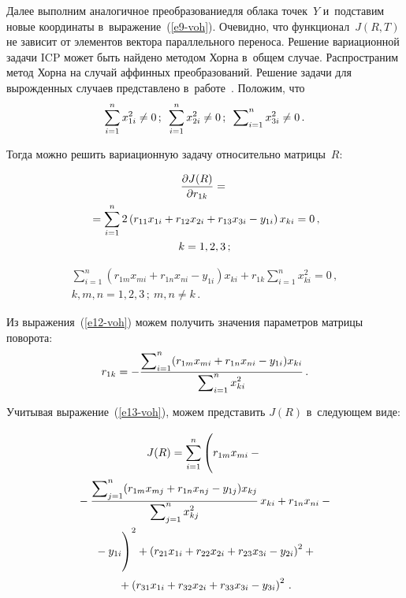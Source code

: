 \begin{multicols}{2}
  Далее выполним аналогичное преобразование\linebreak для облака точек~$Y$ 
и~подставим новые координаты в~выражение~(\ref{e9-voh}). Очевидно, что 
функционал~$J(R,T)$ не зависит от элементов вектора параллельного переноса. 
Решение вариационной \mbox{задачи} ICP может быть найдено методом Хор\-на 
в~общем случае. Распространим метод Хорна на случай аффинных 
преобразований. Решение задачи для вы\-рож\-ден\-ных случаев представлено 
в~работе~\cite{17-voh}. Положим, что 
$$
\sum\limits^n_{i=1} x^2_{1i}\not=0\,;\enskip 
  \sum\limits^n_{i=1} x^2_{2i}\not=0\,;\enskip
  \sum\nolimits^n_{i=1}  x^2_{3i}\not=0\,.
  $$
  
   Тогда можно решить вариационную задачу относительно 
мат\-ри\-цы~${R}$:

\noindent
  \begin{multline*}
  \displaystyle\frac{\displaystyle \partial J(R)\mathstrut}{\displaystyle \partial r_{1k}\mathstrut} ={}\\
  {}=\sum\limits^n_{i=1} 2\left( 
r_{11}x_{1i}+r_{12} x_{2i}+r_{13}x_{3i}-y_{1i}\right) x_{ki} =0\,,\\
  k=1,2,3\,;
  \end{multline*}
  
\vspace*{-14pt}

  \noindent
  \begin{multline}
  \sum\limits^n_{i=1} \left( 
r_{1{m}}x_{{m}i}+r_{1{n}}x_{{n}i} -
y_{1i}\right) x_{ki} +r_{1k} \sum\limits^n_{i=1} x^2_{ki}=0\,,\\
  k,m,n=1,2,3\,;\ m,n\not= k\,.
  \label{e12-voh}
  \end{multline}
  
  Из выражения~(\ref{e12-voh}) можем получить значения параметров 
мат\-ри\-цы поворота:
  \begin{equation}
  r_{1k}=-\displaystyle\frac{\displaystyle \sum\nolimits^n_{i=1} (r_{1{m}} 
x_{{m}i}+r_{1{n}}x_{{n}i}-
y_{1i})x_{ki}\mathstrut}{\displaystyle \sum\nolimits^n_{i=1} x^2_{ki}\mathstrut}\,.
  \label{e13-voh}
  \end{equation}
  
  Учитывая выражение~(\ref{e13-voh}), можем пред\-ста\-вить $J(R)$ 
в~сле\-ду\-ющем виде:

\noindent
  \begin{multline}
  J(R)= \sum\limits^n_{i=1} \left(
  \vphantom{\fr{\sum\nolimits^n_{j=1} (r_{1{m}}x_{{m}j}+r_{1{n}} 
x_{{n}j}-y_{1j})x_{kj}}{\sum\nolimits^n_{j=1} x^2_{kj}}}
 r_{1{m}}x_{{m}i}-{}\right.\\
  {}-
\fr{\sum\nolimits^n_{j=1} (r_{1{m}}x_{{m}j}+r_{1{n}} 
x_{{n}j}-y_{1j})x_{kj}}{\sum\nolimits^n_{j=1} x^2_{kj}}\,x_{ki} 
+r_{1{n}} x_{{n}i} -{}\\
\left.{}-y_{1i}
  \vphantom{\fr{\sum\nolimits^n_{j=1} (r_{1\mathrm{m}}x_{\mathrm{m}j}+r_{1\mathrm{n}} 
x_{\mathrm{n}j}-y_{1j})x_{kj}}{\sum\nolimits^n_{j=1} x^2_{kj}}}
\right)^2+  \left( r_{21}x_{1i}+r_{22}x_{2i}+r_{23}x_{3i}-y_{2i}\right)^2+{}\\
  {}+ \left(  r_{31}x_{1i} +r_{32}x_{2i}+r_{33} x_{3i} -y_{3i}\right)^2\,.
  \label{e14-voh}
  \end{multline}
  

\end{multicols}

